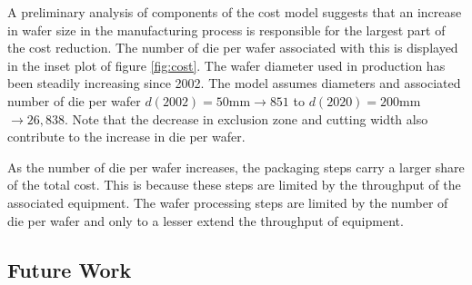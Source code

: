 \documentclass[a4paper,nocompress]{spie}  %
\begin{document}
    A preliminary analysis of components of the cost model suggests that an increase in wafer size in the manufacturing process is responsible for the largest part of the cost reduction. The number of die per wafer associated with this is displayed in the inset plot of figure \ref{fig:cost}. The wafer diameter used in production has been steadily increasing since 2002. The model assumes diameters and associated number of die per wafer  $d(2002)=50$mm$\rightarrow851$ to $d(2020)=200$mm$\rightarrow26,838$. Note that the decrease in exclusion zone and cutting width also contribute to the increase in die per wafer.
    
    As the number of die per wafer increases, the packaging steps carry a larger share of the total cost. This is because these steps are limited by the throughput of the associated equipment. The wafer processing steps are limited by the number of die per wafer and only to a lesser extend the throughput of equipment.
    
\subsection{Future Work}

    
    
\end{document}
